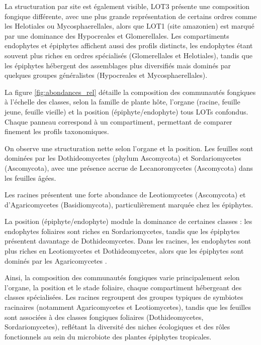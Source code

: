 \documentclass[a4paper,12pt]{article}
\begin{document}
La structuration par site est également visible, LOT3 présente une composition fongique différente, avec une plus grande représentation de certains ordres comme les Helotiales ou Mycosphaerellales, alors que LOT1 (site amazonien) est marqué par une dominance des Hypocreales et Glomerellales. Les compartiments endophytes et épiphytes affichent aussi des profils distincts, les endophytes étant souvent plus riches en ordres spécialisés (Glomerellales et Helotiales), tandis que les épiphytes hébergent des assemblages plus diversifiés mais dominés par quelques groupes généralistes (Hypocreales et Mycosphaerellales).

La figure \ref{fig:abondances_rel} détaille la composition des communautés fongiques à l’échelle des classes, selon la famille de plante hôte, l’organe (racine, feuille jeune, feuille vieille) et la position (épiphyte/endophyte) tous LOTs confondus. Chaque panneau correspond à un compartiment, permettant de comparer finement les profils taxonomiques.

On observe une structuration nette selon l’organe et la position. Les feuilles sont dominées par les Dothideomycetes (phylum Ascomycota) et Sordariomycetes (Ascomycota), avec une présence accrue de Lecanoromycetes (Ascomycota) dans les feuilles âgées.

Les racines présentent une forte abondance de Leotiomycetes (Ascomycota) et d’Agaricomycetes (Basidiomycota), particulièrement marquée chez les épiphytes.

La position (épiphyte/endophyte) module la dominance de certaines classes : les endophytes foliaires sont riches en Sordariomycetes, tandis que les épiphytes présentent davantage de Dothideomycetes. Dans les racines, les endophytes sont plus riches en Leotiomycetes et Dothideomycetes, alors que les épiphytes sont dominés par les Agaricomycetes .

Ainsi, la composition des communautés fongiques varie principalement selon l’organe, la position et le stade foliaire, chaque compartiment hébergeant des classes spécialisées. Les racines regroupent des groupes typiques de symbiotes racinaires (notamment Agaricomycetes et Leotiomycetes), tandis que les feuilles sont associées à des classes fongiques foliaires (Dothideomycetes, Sordariomycetes), reflétant la diversité des niches écologiques et des rôles fonctionnels au sein du microbiote des plantes épiphytes tropicales.
\end{document}
